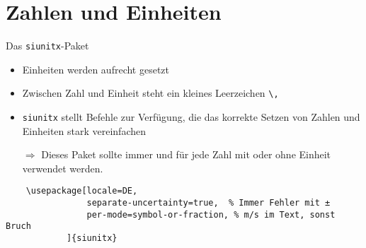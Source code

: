 \section{Zahlen und Einheiten}

\begin{frame}[fragile]{
  Das \texttt{siunitx}-Paket
  \hfill{}
}
\begin{itemize}
    \item Einheiten werden aufrecht gesetzt
    \item Zwischen Zahl und Einheit steht ein kleines Leerzeichen \verb+\,+
    \item \texttt{siunitx} stellt Befehle zur Verfügung, die das korrekte Setzen von Zahlen und Einheiten stark vereinfachen
    \item[$\Rightarrow$] Dieses Paket sollte immer und für jede Zahl mit oder ohne Einheit verwendet werden.
\end{itemize}
  \begin{Packages}
    \begin{lstlisting}
    \usepackage[locale=DE,
                separate-uncertainty=true,  % Immer Fehler mit ±
                per-mode=symbol-or-fraction, % m/s im Text, sonst Bruch
            ]{siunitx}
    \end{lstlisting}
  \end{Packages}
\end{frame}

